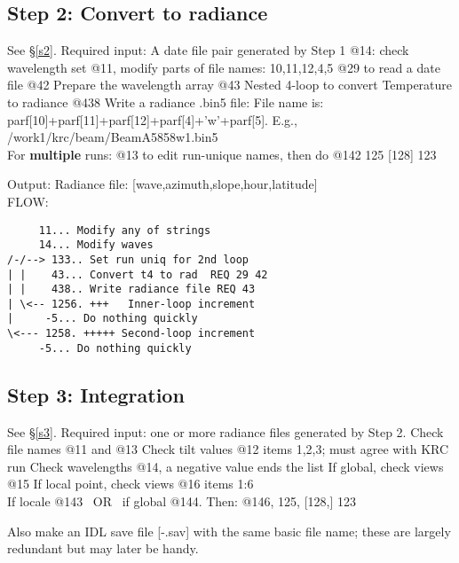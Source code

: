 \documentclass{article}
\begin{document}
\subsection{Step 2: Convert to radiance}
See \S \ref{s2}. Required input: A date file pair generated by Step 1
\qi @14: check wavelength set
\qi @11, modify parts of file names:  10,11,12,4,5
\qi @29 to read a date file
\qi @42 Prepare the wavelength array 
\qi @43 Nested 4-loop to convert Temperature to radiance
\qi @438 Write a radiance .bin5 file:
\qii File name is: parf[10]+parf[11]+parf[12]+parf[4]+'w'+parf[5]. E.g., /work1/krc/beam/BeamA5858w1.bin5
\\ For \textbf{multiple} runs: @13 to edit run-unique names, then do @142 125 [128] 123

Output:  Radiance file: [wave,azimuth,slope,hour,latitude]
\\ FLOW:
\vspace{-3.mm} 
\begin{verbatim}
     11... Modify any of strings
     14... Modify waves
/-/--> 133.. Set run uniq for 2nd loop
| |    43... Convert t4 to rad  REQ 29 42
| |    438.. Write radiance file REQ 43
| \<-- 1256. +++   Inner-loop increment
|     -5... Do nothing quickly
\<--- 1258. +++++ Second-loop increment
     -5... Do nothing quickly
\end{verbatim} 

\subsection{Step 3: Integration}
See \S \ref{s3}. Required input: one or more radiance files generated by Step 2.
\qi Check file names @11 and @13
\qi Check tilt values @12 items 1,2,3; must agree with KRC run
\qi Check wavelengths @14, a negative value ends the list
\qi If global, check views @15
\qi If local point, check views @16 items 1:6 
\\ If locale @143 \  OR \ if global @144.  Then:  @146, 125, [128,] 123

Also make an IDL save file [-.sav] with the same basic file name; these are
largely redundant but may later be handy.
 
\end{document}
